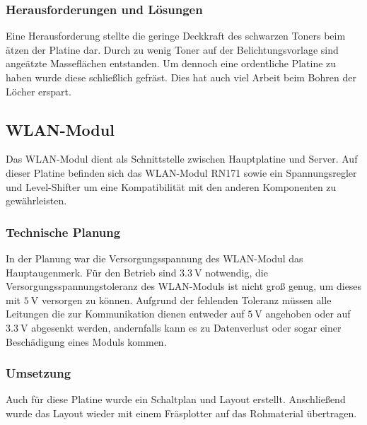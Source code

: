     \subsubsection{Herausforderungen und Lösungen}
    Eine Herausforderung stellte die geringe Deckkraft des schwarzen Toners beim ätzen der Platine dar. Durch zu wenig Toner auf der Belichtungsvorlage sind
    angeätzte Masseflächen entstanden. Um dennoch eine ordentliche Platine zu haben wurde diese schließlich gefräst. Dies hat auch viel Arbeit beim Bohren der
    Löcher erspart.

  \subsection{WLAN-Modul}
  Das WLAN-Modul dient als Schnittstelle zwischen Hauptplatine und Server. Auf dieser Platine befinden sich das WLAN-Modul RN171 sowie ein Spannungsregler und Level-Shifter
  um eine Kompatibilität mit den anderen Komponenten zu gewährleisten.

    \subsubsection{Technische Planung}
    In der Planung war die Versorgungsspannung des WLAN-Modul das Hauptaugenmerk. Für den Betrieb sind $\SI{3.3}{\volt}$ notwendig, die Versorgungsspannungstoleranz
    des WLAN-Moduls ist nicht groß genug, um dieses mit $\SI{5}{\volt}$ versorgen zu können.
    Aufgrund der fehlenden Toleranz müssen alle Leitungen die zur Kommunikation dienen entweder auf $\SI{5}{\volt}$ angehoben oder auf $\SI{3.3}{\volt}$ abgesenkt werden,
    andernfalls kann es zu Datenverlust oder sogar einer Beschädigung eines Moduls kommen.

    \subsubsection{Umsetzung}
    Auch für diese Platine wurde ein Schaltplan und Layout erstellt. Anschließend wurde das Layout wieder mit einem Fräsplotter auf das Rohmaterial übertragen.

